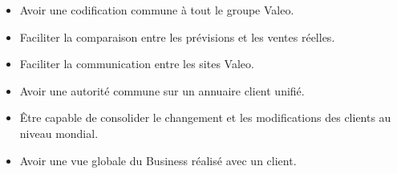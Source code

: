 \begin{itemize}\itemsep7pt
	\item Avoir une codification commune à tout le groupe Valeo. 
	\item Faciliter la comparaison entre les prévisions et les ventes réelles. 
	\item Faciliter la communication entre les sites Valeo. 
	\item Avoir une autorité commune sur un annuaire client unifié.
	\item Être capable de consolider le changement et les modifications des clients au niveau mondial.
	\item Avoir une vue globale du Business réalisé avec un client.
\end{itemize}

\clearpage